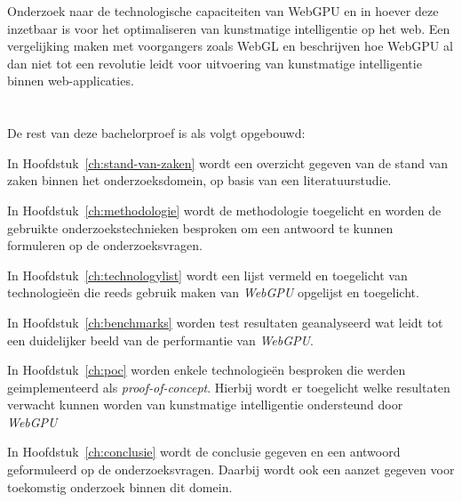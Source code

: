 Onderzoek naar de technologische capaciteiten van WebGPU en in hoever deze inzetbaar is voor het optimaliseren van kunstmatige intelligentie op het web. Een vergelijking maken met voorgangers zoals WebGL en beschrijven hoe WebGPU al dan niet tot een revolutie leidt voor uitvoering van kunstmatige intelligentie binnen web-applicaties.

\break{}

\section{}%
\label{sec:opzet-bachelorproef}


De rest van deze bachelorproef is als volgt opgebouwd:

In Hoofdstuk~\ref{ch:stand-van-zaken} wordt een overzicht gegeven van de stand van zaken binnen het onderzoeksdomein, op basis van een literatuurstudie.

\bigbreak{}

In Hoofdstuk~\ref{ch:methodologie} wordt de methodologie toegelicht en worden de gebruikte onderzoekstechnieken besproken om een antwoord te kunnen formuleren op de onderzoeksvragen.

\bigbreak{}

In Hoofdstuk~\ref{ch:technologylist} wordt een lijst vermeld en toegelicht van technologieën die reeds gebruik maken van \textit{WebGPU} opgelijst en toegelicht.

\bigbreak{}

In Hoofdstuk~\ref{ch:benchmarks} worden test resultaten geanalyseerd wat leidt tot een duidelijker beeld van de performantie van \textit{WebGPU}.

\bigbreak{}

In Hoofdstuk~\ref{ch:poc} worden enkele technologieën besproken die werden geimplementeerd als \textit{proof-of-concept}. Hierbij wordt er toegelicht welke resultaten verwacht kunnen worden van kunstmatige intelligentie ondersteund door \textit{WebGPU}

\bigbreak{}

In Hoofdstuk~\ref{ch:conclusie} wordt de conclusie gegeven en een antwoord geformuleerd op de onderzoeksvragen. Daarbij wordt ook een aanzet gegeven voor toekomstig onderzoek binnen dit domein.